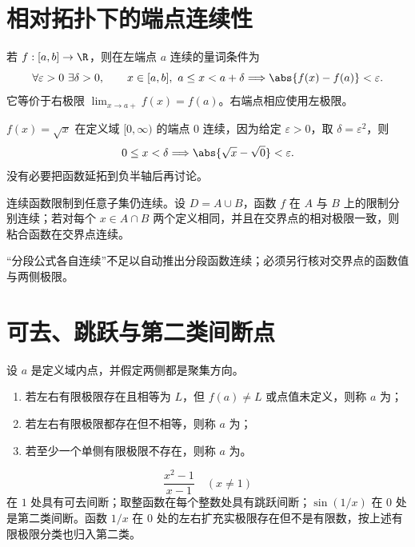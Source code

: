 \section{相对拓扑下的端点连续性}

若 \(f:[a,b]\to\R\)，则在左端点 \(a\) 连续的量词条件为
\[
 \forall\varepsilon>0\ \exists\delta>0,\qquad
 x\in[a,b],\ a\le x<a+\delta
 \Longrightarrow\abs{f(x)-f(a)}<\varepsilon.
\]
它等价于右极限 \(\lim_{x\to a+}f(x)=f(a)\)。右端点相应使用左极限。

\begin{example}
\(f(x)=\sqrt x\) 在定义域 \([0,\infty)\) 的端点 \(0\) 连续，因为给定 \(\varepsilon>0\)，取 \(\delta=\varepsilon^2\)，则
\[
 0\le x<\delta\Longrightarrow\abs{\sqrt x-\sqrt0}<\varepsilon.
\]
没有必要把函数延拓到负半轴后再讨论。
\end{example}

\begin{proposition}[限制与粘合]
连续函数限制到任意子集仍连续。设 \(D=A\cup B\)，函数 \(f\) 在 \(A\) 与 \(B\) 上的限制分别连续；若对每个 \(x\in A\cap B\) 两个定义相同，并且在交界点的相对极限一致，则粘合函数在交界点连续。
\end{proposition}

“分段公式各自连续”不足以自动推出分段函数连续；必须另行核对交界点的函数值与两侧极限。

\section{可去、跳跃与第二类间断点}

设 \(a\) 是定义域内点，并假定两侧都是聚集方向。
\begin{definition}[间断点分类]
\begin{enumerate}
 \item 若左右有限极限存在且相等为 \(L\)，但 \(f(a)\ne L\) 或点值未定义，则称 \(a\) 为；
 \item 若左右有限极限都存在但不相等，则称 \(a\) 为；
 \item 若至少一个单侧有限极限不存在，则称 \(a\) 为。
\end{enumerate}
\end{definition}

\begin{example}
\[
 \frac{x^2-1}{x-1}\quad(x\ne1)
\]
在 \(1\) 处具有可去间断；取整函数在每个整数处具有跳跃间断；\(\sin(1/x)\) 在 \(0\) 处是第二类间断。函数 \(1/x\) 在 \(0\) 处的左右扩充实极限存在但不是有限数，按上述有限极限分类也归入第二类。
\end{example}

